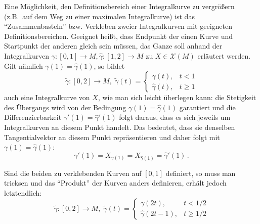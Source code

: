 \documentclass[../H_Analysis_main.tex]{subfiles}
\begin{document}
\begin{bsp}
Eine Möglichkeit, den Definitionsbereich einer Integralkurve zu vergrößern (z.B.~auf dem Weg zu einer maximalen Integralkurve) ist das \enquote{Zusammenbasteln} bzw. Verkleben zweier Integralkurven mit geeigneten Definitionsbereichen. Geeignet heißt, dass Endpunkt der einen Kurve und Startpunkt der anderen gleich sein müssen, das Ganze soll anhand der Integralkurven $\gamma: [0, 1] \rightarrow M, \hat{\gamma}: [1, 2] \rightarrow M$ zu $X \in \mathcal{X}(M)$ erläutert werden. Gilt nämlich $\gamma(1) = \hat{\gamma}(1)$, so bildet
\begin{equation}
\tilde{\gamma}: [0, 2] \rightarrow M, \; \tilde{\gamma}(t) = \begin{cases} \gamma(t), & t < 1 \\ \hat{\gamma}(t), & t \geq 1 \end{cases}
\end{equation}
auch eine Integralkurve von $X$, wie man sich leicht überlegen kann: die Stetigkeit des Übergangs wird von der Bedingung $\gamma(1) = \hat{\gamma}(1)$ garantiert und die Differenzierbarkeit $\gamma'(1) = \hat{\gamma}'(1)$ folgt daraus, dass es sich jeweils um Integralkurven an diesem Punkt handelt. Das bedeutet, dass sie denselben Tangentialvektor an diesem Punkt repräsentieren und daher folgt mit $\gamma(1) = \hat{\gamma}(1)$:
\begin{equation}
\gamma'(1) = X_{\gamma(1)} = X_{\hat{\gamma}(1)} = \hat{\gamma}'(1) \, .
\end{equation}

Sind die beiden zu verklebenden Kurven auf $[0, 1]$ definiert, so muss man tricksen und das \enquote{Produkt} der Kurven anders definieren, erhält jedoch letztendlich:
\begin{equation*}
\tilde{\gamma}: [0, 2] \rightarrow M, \; \tilde{\gamma}(t) = \begin{cases} \gamma(2t), & t < 1/2 \\ \hat{\gamma}(2t - 1), & t \geq 1/2 \end{cases}
\end{equation*}
\end{bsp}
\end{document}
